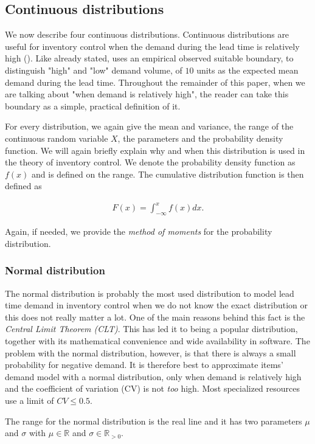 \documentclass{article}
\begin{document}
\subsection{Continuous distributions}
\begin{flushleft}
    We now describe four continuous distributions.
    Continuous distributions are useful for inventory control when the demand during the lead time is relatively high (\cite{RePEc:spr:isorms:978-3-319-15729-0}).
    Like already stated, \cite{silver1998inventory} uses an empirical observed suitable boundary, to distinguish "high" and "low" demand volume, of $10$ units as the expected mean demand during the lead time.
    Throughout the remainder of this paper, when we are talking about "when demand is relatively high", the reader can take this boundary as a simple, practical definition of it.
\end{flushleft}
\begin{flushleft}
    For every distribution, we again give the mean and variance, the range of the continuous random variable $X$, the parameters and the probability density function.
    We will again briefly explain why and when this distribution is used in the theory of inventory control.
    We denote the probability density function as $f(x)$ and is defined on the range.
    The cumulative distribution function is then defined as

    \begin{align*}
        F(x) = \int_{-\infty}^x f(x) dx.
    \end{align*}

    Again, if needed, we provide the \textit{method of moments} for the probability distribution.
\end{flushleft}

\subsubsection{Normal distribution}
\begin{flushleft}
    The normal distribution is probably the most used distribution to model lead time demand in inventory control when we do not know the exact distribution or this does not really matter a lot.
    One of the main reasons behind this fact is the \textit{Central Limit Theorem (CLT)}.
    This has led it to being a popular distribution, together with its mathematical convenience and wide availability in software.
    The problem with the normal distribution, however, is that there is always a small probability for negative demand.
    It is therefore best to approximate items' demand model with a normal distribution, only when demand is relatively high and the coefficient of variation (CV) is not \textit{too} high.
    Most specialized resources use a limit of $CV \le 0.5$.
\end{flushleft}
The range for the normal distribution is the real line and it has two parameters $\mu$ and $\sigma$ with
$\mu \in \mathbb{R}$ and $\sigma \in \mathbb{R}_{>0}$.
\end{document}
